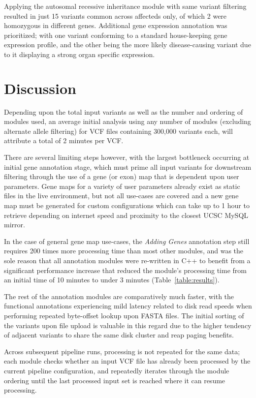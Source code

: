 \documentclass[twocolumn]{bmcart}%
\begin{document}
Applying the autosomal recessive inheritance module with same variant filtering resulted in just 15 variants common across affecteds only, of which 2 were
homozygous in different genes. Additional gene expression annotation was prioritized; with one variant conforming to a standard house-keeping gene expression
profile, and the other being the more likely disease-causing variant due to it displaying a strong organ specific expression.




\section*{Discussion}

Depending upon the total input variants as well as the number and ordering of modules used, an average initial analysis using any number of modules (excluding alternate allele filtering) for VCF files containing 300,000 variants each, will attribute a total of 2 minutes per VCF.

There are several limiting steps however, with the largest bottleneck occurring at initial gene annotation stage, which must prime all input variants for downstream filtering through the use of a gene (or exon) map that is dependent upon user parameters. Gene maps for a variety of user parameters already exist as static files in the live environment, but not all use-cases are covered and a new gene map must be generated for custom configurations which can take up to 1 hour to retrieve depending on internet speed and proximity to the closest UCSC MySQL mirror.

In the case of general gene map use-cases, the \textit{Adding Genes} annotation step still requires 200 times more processing time than most other modules, and was the sole reason that all annotation modules were re-written in C++ to benefit from a significant performance increase that reduced the module's processing time from an initial time of 10 minutes to under 3 minutes (Table~\ref{table:results}). 

The rest of the annotation modules are comparatively much faster, with the functional annotations experiencing mild latency related to disk read speeds when performing repeated byte-offset lookup upon FASTA files. The initial sorting of the variants upon file upload is valuable in this regard due to the higher tendency of adjacent variants to share the same disk cluster and reap paging benefits.

Across subsequent pipeline runs, processing is not repeated for the same data; each module checks whether an input VCF file has already been processed by the current pipeline configuration, and repeatedly iterates through the module ordering until the last processed input set is reached where it can resume processing.
\end{document}
